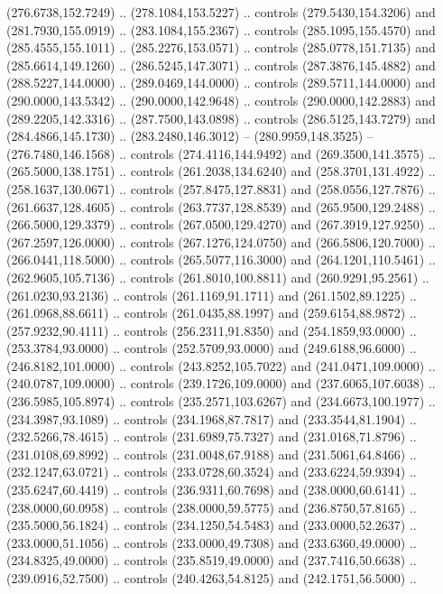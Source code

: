   (276.6738,152.7249) .. (278.1084,153.5227) .. controls (279.5430,154.3206) and
  (281.7930,155.0919) .. (283.1084,155.2367) .. controls (285.1095,155.4570) and
  (285.4555,155.1011) .. (285.2276,153.0571) .. controls (285.0778,151.7135) and
  (285.6614,149.1260) .. (286.5245,147.3071) .. controls (287.3876,145.4882) and
  (288.5227,144.0000) .. (289.0469,144.0000) .. controls (289.5711,144.0000) and
  (290.0000,143.5342) .. (290.0000,142.9648) .. controls (290.0000,142.2883) and
  (289.2205,142.3316) .. (287.7500,143.0898) .. controls (286.5125,143.7279) and
  (284.4866,145.1730) .. (283.2480,146.3012) -- (280.9959,148.3525) --
  (276.7480,146.1568) .. controls (274.4116,144.9492) and (269.3500,141.3575) ..
  (265.5000,138.1751) .. controls (261.2038,134.6240) and (258.3701,131.4922) ..
  (258.1637,130.0671) .. controls (257.8475,127.8831) and (258.0556,127.7876) ..
  (261.6637,128.4605) .. controls (263.7737,128.8539) and (265.9500,129.2488) ..
  (266.5000,129.3379) .. controls (267.0500,129.4270) and (267.3919,127.9250) ..
  (267.2597,126.0000) .. controls (267.1276,124.0750) and (266.5806,120.7000) ..
  (266.0441,118.5000) .. controls (265.5077,116.3000) and (264.1201,110.5461) ..
  (262.9605,105.7136) .. controls (261.8010,100.8811) and (260.9291,95.2561) ..
  (261.0230,93.2136) .. controls (261.1169,91.1711) and (261.1502,89.1225) ..
  (261.0968,88.6611) .. controls (261.0435,88.1997) and (259.6154,88.9872) ..
  (257.9232,90.4111) .. controls (256.2311,91.8350) and (254.1859,93.0000) ..
  (253.3784,93.0000) .. controls (252.5709,93.0000) and (249.6188,96.6000) ..
  (246.8182,101.0000) .. controls (243.8252,105.7022) and (241.0471,109.0000) ..
  (240.0787,109.0000) .. controls (239.1726,109.0000) and (237.6065,107.6038) ..
  (236.5985,105.8974) .. controls (235.2571,103.6267) and (234.6673,100.1977) ..
  (234.3987,93.1089) .. controls (234.1968,87.7817) and (233.3544,81.1904) ..
  (232.5266,78.4615) .. controls (231.6989,75.7327) and (231.0168,71.8796) ..
  (231.0108,69.8992) .. controls (231.0048,67.9188) and (231.5061,64.8466) ..
  (232.1247,63.0721) .. controls (233.0728,60.3524) and (233.6224,59.9394) ..
  (235.6247,60.4419) .. controls (236.9311,60.7698) and (238.0000,60.6141) ..
  (238.0000,60.0958) .. controls (238.0000,59.5775) and (236.8750,57.8165) ..
  (235.5000,56.1824) .. controls (234.1250,54.5483) and (233.0000,52.2637) ..
  (233.0000,51.1056) .. controls (233.0000,49.7308) and (233.6360,49.0000) ..
  (234.8325,49.0000) .. controls (235.8519,49.0000) and (237.7416,50.6638) ..
  (239.0916,52.7500) .. controls (240.4263,54.8125) and (242.1751,56.5000) ..
